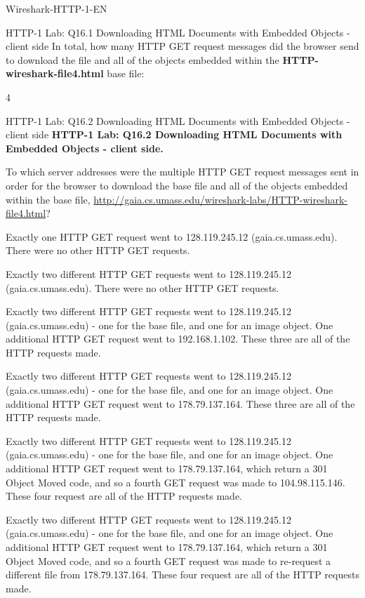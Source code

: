 \documentclass[a4paper]{article}
\begin{document}
\begin{quiz}{Wireshark-HTTP-1-EN}
\begin{shortanswer}[points=1]{HTTP-1 Lab: Q16.1 Downloading HTML Documents with Embedded Objects - client side}
In total, how many HTTP GET request messages did the browser send to download the file and all of the objects embedded within the \textbf{HTTP-wireshark-file4.html} base file:  
\item 4
\end{shortanswer}

\begin{multi}[points=1,shuffle]{HTTP-1 Lab: Q16.2 Downloading HTML Documents with Embedded Objects - client side}
\textbf{HTTP-1 Lab: Q16.2 Downloading HTML Documents with Embedded Objects - client side.} 

To which server addresses were the multiple HTTP GET request messages sent in order for the browser to download the base file and all of the objects embedded within the base file, \href{http://gaia.cs.umass.edu/wireshark-labs/HTTP-wireshark-file4.html}{http://gaia.cs.umass.edu/wireshark-labs/HTTP-wireshark-file4.html}?  
\item Exactly one HTTP GET request went to 128.119.245.12 (gaia.cs.umass.edu). There were no other HTTP GET requests.
\item Exactly two different HTTP GET requests went to 128.119.245.12 (gaia.cs.umass.edu). There were no other HTTP GET requests.
\item Exactly two different HTTP GET requests went to 128.119.245.12 (gaia.cs.umass.edu) - one for the base file, and one for an image object. One additional HTTP GET request went to 192.168.1.102. These three are all of the HTTP requests made.
\item Exactly two different HTTP GET requests went to 128.119.245.12 (gaia.cs.umass.edu) - one for the base file, and one for an image object. One additional HTTP GET request went to 178.79.137.164. These three are all of the HTTP requests made.
\item* Exactly two different HTTP GET requests went to 128.119.245.12 (gaia.cs.umass.edu) - one for the base file, and one for an image object.  One additional HTTP GET request went to 178.79.137.164, which return a 301 Object Moved code, and so a fourth GET request was made to 104.98.115.146. These four request are all of the HTTP requests made.
\item Exactly two different HTTP GET requests went to 128.119.245.12 (gaia.cs.umass.edu) - one for the base file, and one for an image object.  One additional HTTP GET request went to 178.79.137.164, which return a 301 Object Moved code, and so a fourth GET request was made to re-request a different file from 178.79.137.164. These four request are all of the HTTP requests made.
\end{multi}


\end{quiz}
\end{document}
